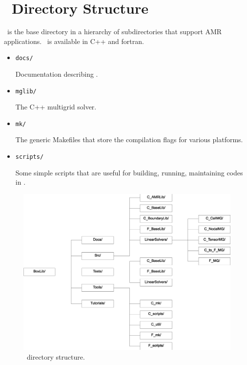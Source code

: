 \section{\BoxLib\ Directory Structure}

\BoxLib\ is the base directory in a hierarchy of subdirectories that
support AMR applications.  \BoxLib\ is available in C++ and fortran.

\begin{itemize}

\item {\tt docs/}

 Documentation describing \BoxLib.

\item {\tt mglib/}

  The C++ multigrid solver.

\item {\tt mk/}

  The generic Makefiles that store the compilation flags for
  various platforms.

\item {\tt scripts/}

  Some simple scripts that are useful for building, running,
  maintaining codes in \BoxLib.

\end{itemize}

\begin{figure}[h]
\centering
\includegraphics[width=6.5in]{./BoxLib/boxlib_directory_bw2}
\caption{\label{fig:boxlib_directory}\BoxLib\ directory structure.}
\end{figure}

